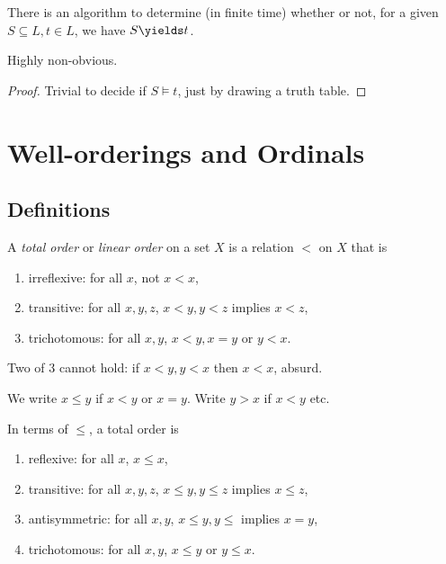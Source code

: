 \documentclass[a4paper]{article}
\begin{document}
\begin{corollary}
  There is an algorithm to determine (in finite time) whether or not, for a given \(S \subseteq L, t\in L\), we have \(S \yields t\).
\end{corollary}

\begin{remark}
  Highly non-obvious.
\end{remark}

\begin{proof}
  Trivial to decide if \(S \models t\), just by drawing a truth table.
\end{proof}

\section{Well-orderings and Ordinals}

\subsection{Definitions}

\begin{definition}
  A \emph{total order} or \emph{linear order} on a set \(X\) is a relation \(<\) on \(X\) that is
  \begin{enumerate}
  \item irreflexive: for all \(x\), not \(x < x\),
  \item transitive: for all \(x, y, z\), \(x < y, y < z\) implies \(x < z\),
  \item trichotomous: for all  \(x, y\), \(x < y, x = y\) or \(y < x\).
  \end{enumerate}
\end{definition}

\begin{note}
  Two of 3 cannot hold: if \(x < y, y < x\) then \(x < x\), absurd.
\end{note}

\begin{notation}
  We write \(x \leq y\) if \(x < y\) or \(x = y\). Write \(y > x\) if \(x < y\) etc.

  In terms of \(\leq\), a total order is
  \begin{enumerate}
  \item reflexive: for all \(x\), \(x \leq x\),
  \item transitive: for all \(x, y, z\), \(x \leq y, y \leq z\) implies \(x \leq z\),
  \item antisymmetric: for all \(x, y\), \(x \leq y, y \leq\) implies \(x = y\),
  \item trichotomous: for all \(x, y\), \(x \leq y\) or \(y \leq x\).
  \end{enumerate}
\end{notation}
\end{document}
